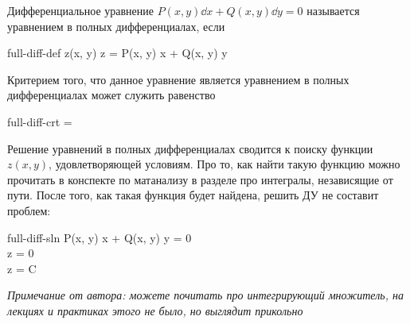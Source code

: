 
\begin{definition}
  Дифференциальное уравнение \(P(x, y) \dd x + Q(x, y) \dd y = 0\) называется
  уравнением в полных дифференциалах, если
  \begin{lequation}{full-diff-def}
    \exists z(x, y) \colon \dd z = P(x, y) \dd x + Q(x, y) \dd y
  \end{lequation}
\end{definition}

Критерием того, что данное уравнение является уравнением в полных
дифференциалах может служить равенство

\begin{lequation}{full-diff-crt}
   =  
\end{lequation}

Решение уравнений в полных дифференциалах сводится к поиску функции \(z(x, y)\),
удовлетворяющей условиям. Про то, как найти такую функцию можно прочитать в
конспекте по матанализу в разделе про интегралы, независящие от пути. После
того, как такая функция будет найдена, решить ДУ не составит проблем:

\begin{lequation}{full-diff-sln}
  P(x, y) \dd x + Q(x, y) \dd y = 0 \\
  \dd z = 0 \\
  z = C
\end{lequation}

\textit{Примечание от автора: можете почитать про интегрирующий множитель, 
на лекциях и практиках этого не было, но выглядит прикольно}
